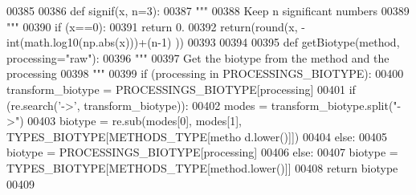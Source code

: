 \begin{DoxyCode}
00385 
00386 \textcolor{keyword}{def }signif(x, n=3):
00387     \textcolor{stringliteral}{"""}
00388 \textcolor{stringliteral}{    Keep n significant numbers}
00389 \textcolor{stringliteral}{    """}
00390     \textcolor{keywordflow}{if} (x==0):
00391         \textcolor{keywordflow}{return} 0.
00392     \textcolor{keywordflow}{return}(round(x, -int(math.log10(np.abs(x)))+(n-1) ))
00393 
00394 
00395 \textcolor{keyword}{def }getBiotype(method, processing="raw"):
00396     \textcolor{stringliteral}{"""}
00397 \textcolor{stringliteral}{    Get the biotype from the method and the processing}
00398 \textcolor{stringliteral}{    """}
00399     \textcolor{keywordflow}{if} (processing \textcolor{keywordflow}{in} PROCESSINGS\_BIOTYPE):
00400         transform\_biotype = PROCESSINGS\_BIOTYPE[processing]
00401         \textcolor{keywordflow}{if} (re.search(\textcolor{stringliteral}{'->'}, transform\_biotype)):
00402             modes = transform\_biotype.split(\textcolor{stringliteral}{"->"})
00403             biotype = re.sub(modes[0], modes[1], TYPES\_BIOTYPE[METHODS\_TYPE[metho
      d.lower()]])
00404         \textcolor{keywordflow}{else}:
00405             biotype = PROCESSINGS\_BIOTYPE[processing]
00406     \textcolor{keywordflow}{else}:
00407         biotype = TYPES\_BIOTYPE[METHODS\_TYPE[method.lower()]]
00408     \textcolor{keywordflow}{return} biotype
00409 
\end{DoxyCode}
